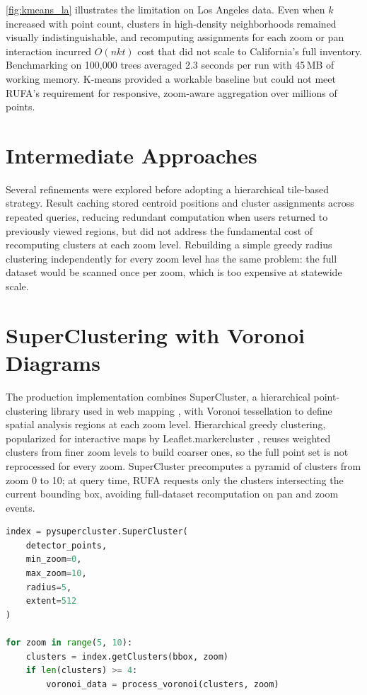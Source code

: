 \autoref{fig:kmeans_la} illustrates the limitation on Los Angeles data. Even when $k$ increased with point count, clusters in high-density neighborhoods remained visually indistinguishable, and recomputing assignments for each zoom or pan interaction incurred $O(nkt)$ cost that did not scale to California's full inventory. Benchmarking on 100{,}000 trees averaged 2.3 seconds per run with 45\,MB of working memory. K-means provided a workable baseline but could not meet RUFA's requirement for responsive, zoom-aware aggregation over millions of points.

\section{Intermediate Approaches}

Several refinements were explored before adopting a hierarchical tile-based strategy. Result caching stored centroid positions and cluster assignments across repeated queries, reducing redundant computation when users returned to previously viewed regions, but did not address the fundamental cost of recomputing clusters at each zoom level. Rebuilding a simple greedy radius clustering independently for every zoom level has the same problem: the full dataset would be scanned once per zoom, which is too expensive at statewide scale.

\section{SuperClustering with Voronoi Diagrams}

The production implementation combines SuperCluster, a hierarchical point-clustering library used in web mapping \cite{agafonkin2016supercluster}, with Voronoi tessellation to define spatial analysis regions at each zoom level. Hierarchical greedy clustering, popularized for interactive maps by Leaflet.markercluster \cite{leaver2012markercluster}, reuses weighted clusters from finer zoom levels to build coarser ones, so the full point set is not reprocessed for every zoom. SuperCluster precomputes a pyramid of clusters from zoom 0 to 10; at query time, RUFA requests only the clusters intersecting the current bounding box, avoiding full-dataset recomputation on pan and zoom events.

\begin{lstlisting}[language=Python, caption=SuperCluster initialization and zoom-level processing]
index = pysupercluster.SuperCluster(
    detector_points,
    min_zoom=0,
    max_zoom=10,
    radius=5,
    extent=512
)

for zoom in range(5, 10):
    clusters = index.getClusters(bbox, zoom)
    if len(clusters) >= 4:
        voronoi_data = process_voronoi(clusters, zoom)
\end{lstlisting}

